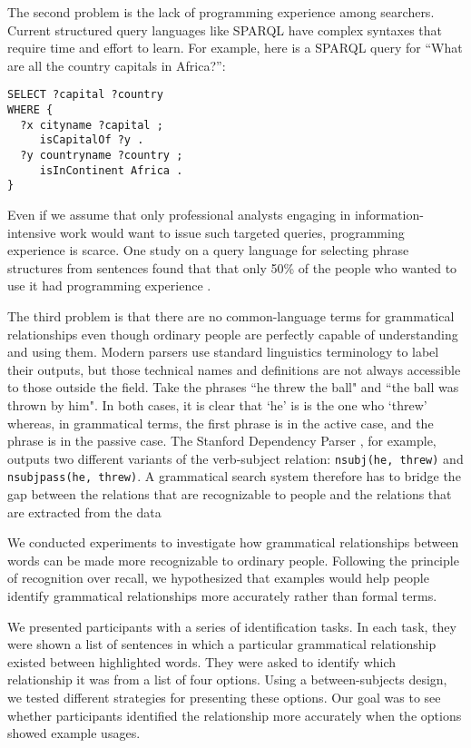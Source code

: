 \documentclass{sigchi}
\newcommand{\code}[1] {\texttt{#1}}
\begin{document}
The second problem is the lack of programming experience among searchers. Current structured query languages like SPARQL have complex syntaxes that require time and effort to learn. For example, here is a SPARQL query for ``What are all the country capitals in Africa?'':
\begin{verbatim}
SELECT ?capital ?country
WHERE {
  ?x cityname ?capital ;
     isCapitalOf ?y .
  ?y countryname ?country ;
     isInContinent Africa .
}
\end{verbatim}
Even if we assume that only professional analysts engaging in information-intensive work would want to issue such targeted queries,  programming experience is scarce. One study on a query language for selecting phrase structures from sentences found that that only 50\% of the people who wanted to use it had programming experience \cite{}.

The third problem is that there are no common-language terms for grammatical relationships even though ordinary people are perfectly capable of understanding and using them. Modern parsers use standard linguistics terminology to label their outputs, but those technical names and definitions are not always accessible to those outside the field. Take the phrases ``he threw the ball" and ``the ball was thrown by him". In both cases, it is clear that `he' is is the one who `threw' whereas, in grammatical terms, the first phrase is in the active case, and the phrase is in the passive case. The Stanford Dependency Parser \cite{}, for example, outputs two different variants of the verb-subject relation: \code{nsubj(he, threw)} and \code{nsubjpass(he, threw)}. A grammatical search system therefore has to bridge the gap between the relations that are recognizable to people and the relations that are extracted from the data

We conducted experiments to investigate how grammatical relationships between words can be made more recognizable to ordinary people. Following the principle of recognition over recall, we hypothesized that examples would help people identify grammatical relationships more accurately rather than formal terms. 

We presented participants with a series of identification tasks. In each task, they were shown a list of sentences in which a particular grammatical relationship existed between highlighted words. They were asked to identify which relationship it was from a list of four options.  Using a between-subjects design, we tested different strategies for presenting these options. Our goal was to see whether participants identified the relationship more accurately when the options showed example usages.
\end{document}

